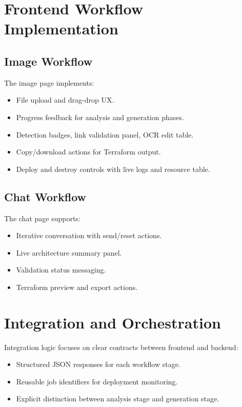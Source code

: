 \documentclass[12pt,a4paper,openany]{report}
\begin{document}
\section{Frontend Workflow Implementation}

\subsection{Image Workflow}

The image page implements:
\begin{itemize}
    \item File upload and drag-drop UX.
    \item Progress feedback for analysis and generation phases.
    \item Detection badges, link validation panel, OCR edit table.
    \item Copy/download actions for Terraform output.
    \item Deploy and destroy controls with live logs and resource table.
\end{itemize}

\subsection{Chat Workflow}

The chat page supports:
\begin{itemize}
    \item Iterative conversation with send/reset actions.
    \item Live architecture summary panel.
    \item Validation status messaging.
    \item Terraform preview and export actions.
\end{itemize}

\section{Integration and Orchestration}

Integration logic focuses on clear contracts between frontend and backend:
\begin{itemize}
    \item Structured JSON responses for each workflow stage.
    \item Reusable job identifiers for deployment monitoring.
    \item Explicit distinction between analysis stage and generation stage.
\end{itemize}
\end{document}
